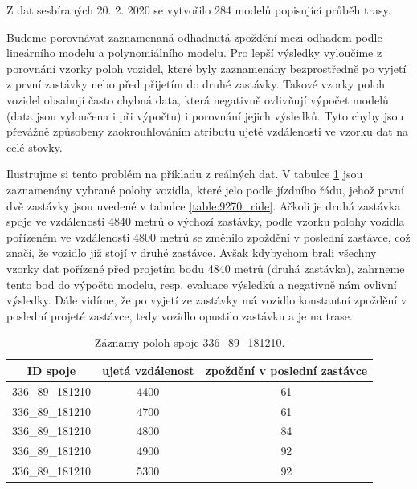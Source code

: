 \bigbreak


Z dat sesbíraných 20. 2. 2020 se vytvořilo 284 modelů popisující průběh trasy.


\bigbreak


Budeme porovnávat zaznamenaná odhadnutá zpoždění mezi odhadem podle lineárního modelu a polynomiálního modelu. Pro lepší výsledky vyloučíme z porovnání vzorky poloh vozidel, které byly zaznamenány bezprostředně po vyjetí z první zastávky nebo před přijetím do druhé zastávky. Takové vzorky poloh vozidel obsahují často chybná data, která negativně ovlivňují výpočet modelů (data jsou vyloučena i při výpočtu) i porovnání jejich výsledků. Tyto chyby jsou převážně způsobeny zaokrouhlováním atributu ujeté vzdálenosti ve vzorku dat na celé stovky.


\bigbreak


Ilustrujme si tento problém na příkladu z reálných dat. V tabulce \ref{table:9270_samples} jsou zaznamenány vybrané polohy vozidla, které jelo podle jízdního řádu, jehož první dvě zastávky jsou uvedené v tabulce \ref{table:9270_ride}. Ačkoli je druhá zastávka spoje ve vzdálenosti 4840 metrů o výchozí zastávky, podle vzorku polohy vozidla pořízeném ve vzdálenosti 4800 metrů se změnilo zpoždění v poslední zastávce, což značí, že vozidlo již stojí v druhé zastávce. Avšak kdybychom brali všechny vzorky dat pořízené před projetím bodu 4840 metrů (druhá zastávka), zahrneme tento bod do výpočtu modelu, resp. evaluace výsledků a negativně nám ovlivní výsledky. Dále vidíme, že po vyjetí ze zastávky má vozidlo konstantní zpoždění v poslední projeté zastávce, tedy vozidlo opustilo zastávku a je na trase.


\begin{center}
   \begin{table}[ht]
\centering
\begin{tabular}{|c|c|c|}
\hline
ID spoje & ujetá vzdálenost & zpoždění v poslední zastávce \\ \hline \hline
336\_89\_181210 & 4400 & 61 \\ \hline
336\_89\_181210 & 4700 & 61 \\ \hline
336\_89\_181210 & 4800 & 84 \\ \hline
336\_89\_181210 & 4900 & 92 \\ \hline
336\_89\_181210 & 5300 & 92 \\ \hline
\end{tabular}
\label{table:9270_samples}
\caption{Záznamy poloh spoje 336\_89\_181210.}
\end{table}
\end{center}


